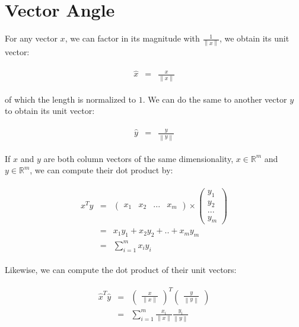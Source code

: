 \documentclass[
  letterpaper,
]{scrbook}
\begin{document}
\section{Vector Angle}\label{vector-angle}

For any vector \(x\), we can factor in its magnitude with
\(\frac{1}{\left\lVert x \right\rVert}\), we obtain its unit vector:

\[\begin{aligned}
  \begin{matrix}
    \hat{x} & = & \frac{x}{\left\lVert x \right\rVert}
    \end{matrix}
\end{aligned}\]

of which the length is normalized to \(1\). We can do the same to
another vector \(y\) to obtain its unit vector:

\[\begin{aligned}
  \begin{matrix}
    \hat{y} & = & \frac{y}{\left\lVert y \right\rVert}
    \end{matrix}
\end{aligned}\]

If \(x\) and \(y\) are both column vectors of the same dimensionality,
\(x \in \mathbb{R}^{m}\) and \(y \in \mathbb{R}^{m}\), we can compute
their dot product by:

\[\begin{aligned}
  \begin{matrix}
    x^Ty & = &
      \begin{pmatrix}
        x_1 &
        x_2 &
        ... &
        x_m
      \end{pmatrix}
      \times
      \begin{pmatrix}
        y_1 \\
        y_2 \\
        ... \\
        y_m
      \end{pmatrix} \\
      & = & x_1 y_1 + x_2 y_2 + .. + x_m y_m \\
      & = & \sum_{i=1}^{m} x_i y_i
    \end{matrix}
\end{aligned}\]

Likewise, we can compute the dot product of their unit vectors:

\[\begin{aligned}
  \begin{matrix}
    \hat{x}^T\hat{y}
      & = &
      \begin{pmatrix}\frac{x}{\left\lVert x \right\rVert}\end{pmatrix}^T
      \begin{pmatrix}\frac{y}{\left\lVert y \right\rVert} \end{pmatrix} \\
      & = & \sum_{i=1}^{m} \frac{x_i}{\left\lVert x \right\rVert} \frac{y_i}{\left\lVert y \right\rVert}
    \end{matrix}
\end{aligned}\]
\end{document}
